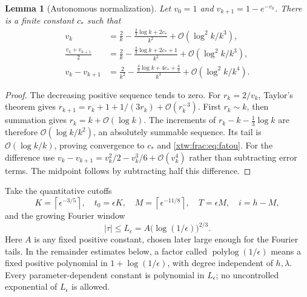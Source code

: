 \documentclass[11pt]{article}
\newtheorem{lemma}[theorem]{Lemma}
\theoremstyle{remark}\newtheorem{remark}[theorem]{Remark}
\newcommand{\OO}{\mathcal O}
\newcommand{\ceil}[1]{\left\lceil #1\right\rceil}
\begin{document}
\begin{lemma}[Autonomous normalization]\label{xtw:frac:lem:fatou}
Let $v_0=1$ and $v_{k+1}=1-e^{-v_k}$. There is a finite constant $c_*$ such that
\begin{align}
 v_k&=\frac2k-\frac{\frac23\log k+2c_*}{k^2}
                       +\OO(\log^2k/k^3),\label{xtw:frac:eq:fatou}\\
 \frac{v_k+v_{k+1}}2&=\frac2k-
        \frac{\frac23\log k+2c_*+1}{k^2}+\OO(\log^2k/k^3),\\
 v_k-v_{k+1}&=\frac2{k^2}-
        \frac{\frac43\log k+4c_*+\frac43}{k^3}
                     +\OO(\log^2k/k^4).
\end{align}
\end{lemma}
\begin{proof}
The decreasing positive sequence tends to zero. For $r_k=2/v_k$, Taylor's
theorem gives $r_{k+1}=r_k+1+1/(3r_k)+\OO(r_k^{-3})$.
First $r_k\sim k$, then summation gives $r_k=k+\OO(\log k)$.
The increments of $r_k-k-\frac13\log k$ are therefore
$\OO(\log k/k^2)$, an absolutely summable sequence. Its tail is
$\OO(\log k/k)$, proving convergence to $c_*$ and \eqref{xtw:frac:eq:fatou}.
For the difference use
$v_k-v_{k+1}=v_k^2/2-v_k^3/6+\OO(v_k^4)$ rather than subtracting error
terms. The midpoint follows by subtracting half this difference.
\end{proof}

Take the quantitative cutoffs
\begin{equation}\label{xtw:frac:eq:cutoffs}
 K=\ceil{\epsilon^{-3/5}},\quad t_0=\epsilon K,\quad
 M=\ceil{\epsilon^{-11/8}},\quad T=\epsilon M,\quad i=h-M,
\end{equation}
and the growing Fourier window
\begin{equation}\label{xtw:frac:eq:window}
 |\tau|\le L_\epsilon=A\bigl(\log(1/\epsilon)\bigr)^{2/3}.
\end{equation}
Here $A$ is any fixed positive constant, chosen later large enough for the
Fourier tails. In the remainder estimates below, a factor called
$\operatorname{polylog}(1/\epsilon)$ means a fixed positive polynomial in
$1+\log(1/\epsilon)$, with degree independent of $h,\lambda$.
Every parameter-dependent constant is polynomial in $L_\epsilon$; no
uncontrolled exponential of $L_\epsilon$ is allowed.
\end{document}
